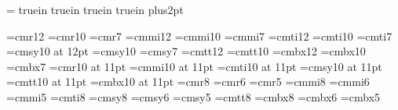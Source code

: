 %


\magnification=
 truein
 truein
 truein
 truein
\parskip=3pt plus2pt
\raggedbottom


%
\font\twelverm=cmr12           \font\tenrm=cmr10   \font\sevenrm=cmr7
\font\twelvei=cmmi12           \font\teni=cmmi10   \font\seveni=cmmi7
\font\twelveit=cmti12          \font\tenit=cmti10  \font\sevenit=cmti7
\font\twelvesy=cmsy10 at 12pt  \font\tensy=cmsy10  \font\sevensy=cmsy7
\font\twelvett=cmtt12          \font\tentt=cmtt10  
\font\twelvebf=cmbx12          \font\tenbf=cmbx10  \font\sevenbf=cmbx7
%
\font\elevenrm=cmr10 at 11pt
\font\eleveni=cmmi10 at 11pt
\font\elevenit=cmti10 at 11pt
\font\elevensy=cmsy10 at 11pt
\font\eleventt=cmtt10 at 11pt
\font\elevenbf=cmbx10 at 11pt
%
\font\eightrm=cmr8    \font\sixrm=cmr6    \font\fiverm=cmr5
\font\eighti=cmmi8    \font\sixi=cmmi6    \font\fivei=cmmi5
\font\eightit=cmti8
\font\eightsy=cmsy8   \font\sixsy=cmsy6   \font\fivesy=cmsy5
\font\eighttt=cmtt8
\font\eightbf=cmbx8   \font\sixbf=cmbx6   \font\fivebf=cmbx5
\def\twelvepoint{\def\rm{\fam0\twelverm}
    \textfont0=\twelverm \scriptfont0=\tenrm \scriptscriptfont0=\sevenrm
    \textfont1=\twelvei  \scriptfont1=\teni  \scriptscriptfont1=\seveni
    \textfont2=\twelvesy \scriptfont2=\tensy \scriptscriptfont2=\sevensy
    \textfont\itfam=\twelveit  \def\it{\fam\itfam\twelveit}
    \textfont\ttfam=\twelvett  \def\tt{\fam\ttfam\twelvett}
    \textfont\bffam=\twelvebf  \scriptfont\bffam=\tenbf
      \scriptscriptfont\bffam=\tenbf   \def\bf{\fam\bffam\twelvebf}
    \normalbaselineskip=16pt
    \setbox\strutbox=\hbox{\vrule height12pt depth4pt width0pt}
    \normalbaselines\rm}
\def\elevenpoint{\def\rm{\fam0\elevenrm}
    \textfont0=\elevenrm \scriptfont0=\eightrm \scriptscriptfont0=\sixrm
    \textfont1=\eleveni  \scriptfont1=\eighti  \scriptscriptfont1=\sixi
    \textfont2=\elevensy \scriptfont2=\eightsy \scriptscriptfont2=\sixsy
    \textfont\itfam=\elevenit  \def\it{\fam\itfam\elevenit}
    \textfont\ttfam=\eleventt  \def\tt{\fam\ttfam\eleventt}
    \textfont\bffam=\elevenbf  \scriptfont\bffam=\eightbf
      \scriptscriptfont\bffam=\sixbf   \def\bf{\fam\bffam\elevenbf}
    \normalbaselineskip=13pt
    \setbox\strutbox=\hbox{\vrule height8.5pt depth3.5pt width0pt}
    \normalbaselines\rm}
